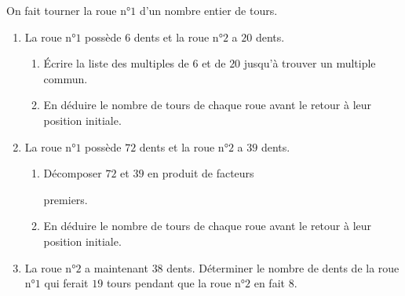 \begin{exercice*}[Engrenages]
        On fait tourner la roue n°$1$ d'un nombre entier de tours.
    \begin{enumerate}
        \item     La roue n°$1$ possède $6$ dents et la roue n°$2$ a $20$ dents.
        \begin{enumerate}
            \item Écrire la liste des multiples de $6$ et de $20$ jusqu'à trouver un multiple commun.
            \item En déduire le nombre de tours de chaque roue avant le retour à leur position initiale.
        \end{enumerate}
        \item La roue n°$1$ possède $72$ dents et la roue n°$2$ a $39$ dents.
        \begin{enumerate}
            \item Décomposer $72$ et $39$ en produit de facteurs 
            
            premiers.
            \item En déduire le nombre de tours de chaque roue avant le retour à leur position initiale.
        \end{enumerate}
        \item La roue n°$2$ a maintenant $38$ dents. Déterminer le nombre de dents de la roue n°$1$ qui ferait $19$ tours pendant que la roue n°$2$ en fait $8$.
    \end{enumerate}        
\end{exercice*}
